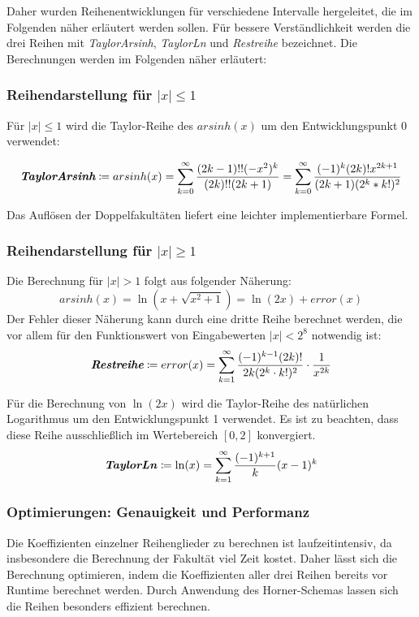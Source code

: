 \documentclass[course=erap] {aspdoc}
\begin{document}
    Daher wurden Reihenentwicklungen für verschiedene Intervalle hergeleitet, die im Folgenden näher erläutert werden sollen.
    Für bessere Verständlichkeit werden die drei Reihen mit \textit{TaylorArsinh}, \textit{TaylorLn} und \textit{Restreihe} bezeichnet.
    Die Berechnungen werden im Folgenden näher erläutert:

    \subsubsection{Reihendarstellung für $|x|\leq 1$}
    Für $|x| \leq 1$ wird die Taylor-Reihe des $arsinh(x)$ um den Entwicklungspunkt 0 verwendet:

    \[
        \textit{\textbf{TaylorArsinh}}\coloneqq arsinh(x) = \sum_{k = 0}^{\infty} \frac{(2k-1)!!(-x^2)^k}{(2k)!!(2k + 1)}
        = \sum_{k = 0}^{\infty} \frac{(-1)^k(2k)!x^{2k + 1}}{(2k + 1)(2^k*k!)^2}
    \]

    Das Auflösen der Doppelfakultäten liefert eine leichter implementierbare Formel.

    \subsubsection{Reihendarstellung für $|x|\geq 1$}
    Die Berechnung für $|x| > 1$ folgt aus folgender Näherung:
    \[
        arsinh(x) = \ln(x + \sqrt{x^2 + 1}) = \ln(2x) + error(x)
    \]
    Der Fehler dieser Näherung kann durch eine dritte Reihe berechnet werden, die vor allem für den Funktionswert von Eingabewerten $|x| < 2^{8}$ notwendig ist:
    \[
        \textit{\textbf{Restreihe}}\coloneqq error(x) =  \sum_{k = 1}^{\infty} \frac{(-1)^{k - 1}(2k)!}{2k(2^k\cdot k!)^2} \cdot \frac{1}{x^{2k}}
    \]

    Für die Berechnung von $\ln(2x)$ wird die Taylor-Reihe des natürlichen Logarithmus um den Entwicklungspunkt 1 verwendet.
    Es ist zu beachten, dass diese Reihe ausschließlich im Wertebereich $[0, 2]$ konvergiert.
    \[
        \textbf{\textit{TaylorLn}}\coloneqq\ln(x) = \sum_{k = 1}^{\infty} \frac{(-1)^{k + 1}}{k}(x - 1)^k
    \]

    \subsubsection{Optimierungen: Genauigkeit und Performanz}

    Die Koeffizienten einzelner Reihenglieder zu berechnen ist laufzeitintensiv, da insbesondere die Berechnung der Fakultät viel Zeit kostet.
    Daher lässt sich die Berechnung optimieren, indem die Koeffizienten aller drei Reihen bereits vor Runtime berechnet werden.
    Durch Anwendung des Horner-Schemas lassen sich die Reihen besonders effizient berechnen.
\end{document}
